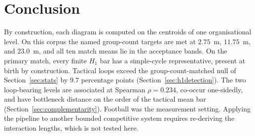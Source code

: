 \section{Conclusion}

By construction, each diagram is computed on the centroids of one
organisational level. On this corpus the named group-count targets
are met at $2.75$~m, $11.75$~m, and $23.0$~m, and all ten match
means lie in the acceptance bands. On the primary match, every
finite $H_1$ bar has a simple-cycle representative, present at birth
by construction. Tactical loops exceed the group-count-matched null
of Section~\ref{sec:stats} by $9.7$ percentage points
(Section~\ref{sec:h1detection}). The two loop-bearing levels are
associated at Spearman $\rho=0.234$, co-occur one-sidedly, and have
bottleneck distance on the order of the tactical mean bar
(Section~\ref{sec:complementarity}). Football was the measurement
setting. Applying the pipeline to another bounded competitive system
requires re-deriving the interaction lengths, which is not tested
here.
